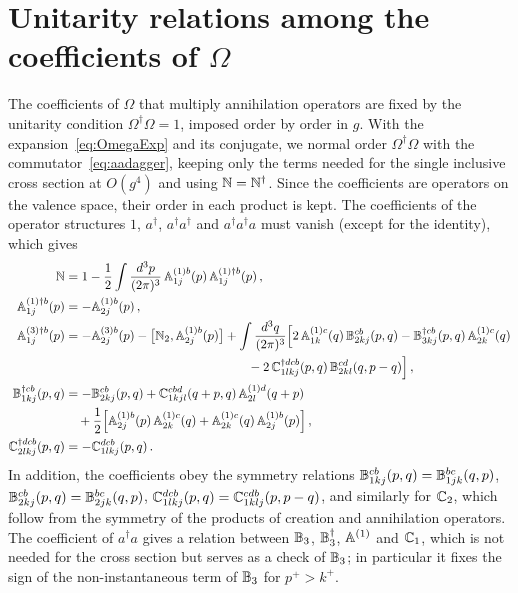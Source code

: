 \section{Unitarity relations among the coefficients of \texorpdfstring{$\Omega$}{Omega}}\label{app:unitarity}

The coefficients of $\Omega$ that multiply annihilation operators are fixed by the unitarity condition $\Omega^\dagger\Omega=1$, imposed order by order in $g$. With the expansion~\eqref{eq:OmegaExp} and its conjugate, we normal order $\Omega^\dagger\Omega$ with the commutator~\eqref{eq:aadagger}, keeping only the terms needed for the single inclusive cross section at $O(g^4)$ and using $\mathbb{N}=\mathbb{N}^\dagger$. Since the coefficients are operators on the valence space, their order in each product is kept. The coefficients of the operator structures $1$, $a^\dagger$, $a^\dagger a^\dagger$ and $a^\dagger a^\dagger a$ must vanish (except for the identity), which gives
\begin{align}
\mf N&=1-\frac12\int\frac{d^3p}{(2\pi)^3}\,\mf A^{(1)b}_{1j}(p)\,\mf A^{(1)\dagger b}_{1j}(p)\,,\label{eq:Nunit}\\
\mf A^{(1)\dagger b}_{1j}(p)&=-\mf A^{(1)b}_{2j}(p)\,,\label{eq:A11unit}\\
\mf A^{(3)\dagger b}_{1j}(p)&=-\mf A^{(3)b}_{2j}(p)-\big[\mf N_2,\mf A^{(1)b}_{2j}(p)\big]
+\int\frac{d^3q}{(2\pi)^3}\Big[2\,\mf A^{(1)c}_{1k}(q)\,\mf B^{cb}_{2kj}(p,q)-\mf B^{\dagger cb}_{3kj}(p,q)\,\mf A^{(1)c}_{2k}(q)
\notag\\&\hspace{5.1cm}
-2\,\mf C^{\dagger dcb}_{1lkj}(p,q)\,\mf B^{cd}_{2kl}(q,p-q)\Big]\,,\label{eq:A31unit}\\
\mf B^{\dagger cb}_{1kj}(p,q)&=-\mf B^{cb}_{2kj}(p,q)+\mf C^{cbd}_{1kjl}(q+p,q)\,\mf A^{(1)d}_{2l}(q+p)\notag\\&\quad+\frac12\Big[\mf A^{(1)b}_{2j}(p)\,\mf A^{(1)c}_{2k}(q)+\mf A^{(1)c}_{2k}(q)\,\mf A^{(1)b}_{2j}(p)\Big]\,,\label{eq:B1unit}\\
\mf C^{\dagger dcb}_{2lkj}(p,q)&=-\mf C^{dcb}_{1lkj}(p,q)\,.\label{eq:C2unit}
\end{align}
In addition, the coefficients obey the symmetry relations $\mathbb{B}^{cb}_{1kj}(p,q)=\mathbb{B}^{bc}_{1jk}(q,p)$, $\mathbb{B}^{cb}_{2kj}(p,q)=\mathbb{B}^{bc}_{2jk}(q,p)$, $\mathbb{C}^{dcb}_{1lkj}(p,q)=\mathbb{C}^{cdb}_{1klj}(p,p-q)$, and similarly for $\mathbb{C}_2$, which follow from the symmetry of the products of creation and annihilation operators. The coefficient of $a^\dagger a$ gives a relation between $\mathbb{B}_3$, $\mathbb{B}_3^\dagger$, $\mathbb{A}^{(1)}$ and $\mathbb{C}_1$, which is not needed for the cross section but serves as a check of $\mathbb{B}_3$; in particular it fixes the sign of the non-instantaneous term of $\mathbb{B}_3$ for $p^+>k^+$.


